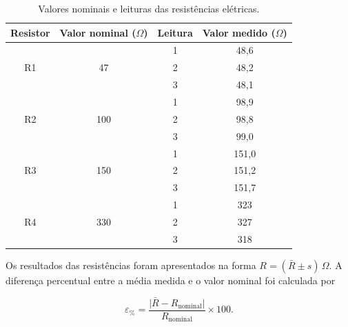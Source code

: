 \documentclass[a4paper,12pt]{article}
\begin{document}
\begin{table}[H]
  \centering
  \caption{Valores nominais e leituras das resistências elétricas.}
  \label{tab:leituras_resistores}
  \medskip

  \begin{tabular}{cccc}
    \toprule
    \textbf{Resistor}
    & \shortstack{\textbf{Valor nominal}\\($\Omega$)}
    & \textbf{Leitura}
    & \shortstack{\textbf{Valor medido}\\($\Omega$)} \\
    \midrule
    \multirow{3}{*}{R1} & \multirow{3}{*}{47}
      & 1 & 48,6 \\
      & & 2 & 48,2 \\
      & & 3 & 48,1 \\
    \midrule
    \multirow{3}{*}{R2} & \multirow{3}{*}{100}
      & 1 & 98,9 \\
      & & 2 & 98,8 \\
      & & 3 & 99,0 \\
    \midrule
    \multirow{3}{*}{R3} & \multirow{3}{*}{150}
      & 1 & 151,0 \\
      & & 2 & 151,2 \\
      & & 3 & 151,7 \\
    \midrule
    \multirow{3}{*}{R4} & \multirow{3}{*}{330}
      & 1 & 323 \\
      & & 2 & 327 \\
      & & 3 & 318 \\
    \bottomrule
  \end{tabular}
\end{table}

Os resultados das resistências foram apresentados na forma
$R=(\bar R\pm s)\,\Omega$. A diferença percentual entre a média medida e o
valor nominal foi calculada por

\[
  \varepsilon_{\%}
  =\frac{\lvert \bar R-R_{\mathrm{nominal}}\rvert}
  {R_{\mathrm{nominal}}}\times 100.
\]
\end{document}
